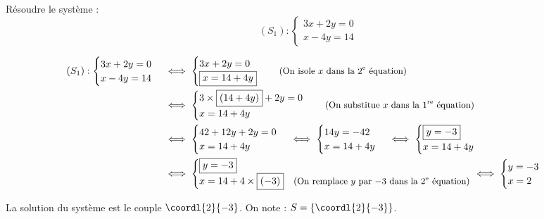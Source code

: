 \begin{ex}
	Résoudre le système :
	\[
		(S_1):\begin{cases}
			3x + 2y = 0 \\
			x - 4y = 14
		\end{cases}
	\]

	\begin{correction}
		\nline
		\begin{align*}
			(S_1):\begin{cases} 3x + 2y = 0 \\ x - 4y = 14 \end{cases} & \iff \begin{cases} 3x + 2y = 0 \\ \boxed{x = 14 + 4y} \end{cases} \quad \text{\small (On isole $x$ dans la $2^\text{e}$ équation)}                                                   \\
			                                                           & \iff \begin{cases} 3\times\boxed{(14 + 4y)} + 2y = 0 \\ x = 14 + 4y \end{cases} \quad \text{\small (On substitue $x$ dans la $1^\text{re}$ équation)}                                \\
			                                                           & \iff \begin{cases} 42 + 12y + 2y = 0 \\ x = 14 + 4y \end{cases} \iff \begin{cases} 14y = -42 \\ x = 14 + 4y \end{cases} \iff \begin{cases} \boxed{y = -3} \\ x = 14 + 4y \end{cases} \\
			                                                           & \iff
			\begin{cases}
				\boxed{y = -3}                 &                                                                        \\
				x = 14 + 4 \times \boxed{(-3)} & \text{\small (On remplace $y$ par $-3$ dans la $2^\text{e}$ équation)}
			\end{cases}
			\iff
			\begin{cases} y = -3 \\ x = 2 \end{cases}
		\end{align*}

		La solution du système est le couple $\coordl{2}{-3}$. On note : $S = \{\coordl{2}{-3}\}$.
	\end{correction}
\end{ex}

